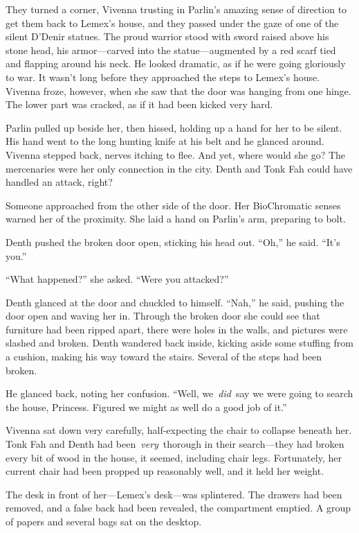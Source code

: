 They turned a corner, Vivenna trusting in Parlin’s amazing sense of direction to get them back to Lemex’s house, and they passed under the gaze of one of the silent D’Denir statues. The proud warrior stood with sword raised above his stone head, his armor—carved into the statue—augmented by a red scarf tied and flapping around his neck. He looked dramatic, as if he were going gloriously to war. It wasn’t long before they approached the steps to Lemex’s house. Vivenna froze, however, when she saw that the door was hanging from one hinge. The lower part was cracked, as if it had been kicked very hard.

Parlin pulled up beside her, then hissed, holding up a hand for her to be silent. His hand went to the long hunting knife at his belt and he glanced around. Vivenna stepped back, nerves itching to flee. And yet, where would she go? The mercenaries were her only connection in the city. Denth and Tonk Fah could have handled an attack, right?

Someone approached from the other side of the door. Her BioChromatic senses warned her of the proximity. She laid a hand on Parlin’s arm, preparing to bolt.

Denth pushed the broken door open, sticking his head out. “Oh,” he said. “It’s you.”

“What happened?” she asked. “Were you attacked?”

Denth glanced at the door and chuckled to himself. “Nah,” he said, pushing the door open and waving her in. Through the broken door she could see that furniture had been ripped apart, there were holes in the walls, and pictures were slashed and broken. Denth wandered back inside, kicking aside some stuffing from a cushion, making his way toward the stairs. Several of the steps had been broken.

He glanced back, noting her confusion. “Well, we~\textit{did}~say we were going to search the house, Princess. Figured we might as well do a good job of it.”

\orn

Vivenna sat down very carefully, half-expecting the chair to collapse beneath her. Tonk Fah and Denth had been~\textit{very}~thorough in their search—they had broken every bit of wood in the house, it seemed, including chair legs. Fortunately, her current chair had been propped up reasonably well, and it held her weight.

The desk in front of her—Lemex’s desk—was splintered. The drawers had been removed, and a false back had been revealed, the compartment emptied. A group of papers and several bags sat on the desktop.

